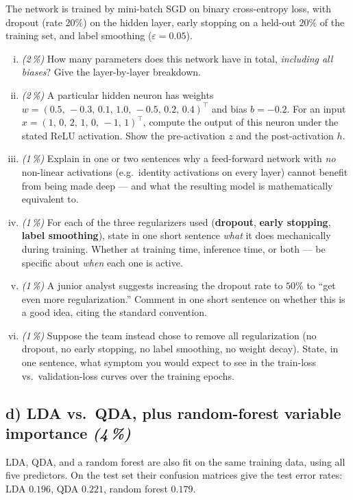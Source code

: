\documentclass[11pt,a4paper]{article}
\newcommand{\subpoints}[1]{\textit{(#1\,\%)}}
\begin{document}
The network is trained by mini-batch SGD on binary cross-entropy loss, with dropout (rate $20\%$) on the hidden layer, early stopping on a held-out $20\%$ of the training set, and label smoothing ($\varepsilon=0.05$).

\begin{enumerate}[(i)]
  \item \subpoints{2} How many parameters does this network have in total, \emph{including all biases}? Give the layer-by-layer breakdown.
  \item \subpoints{2} A particular hidden neuron has weights $w=(0.5,\,-0.3,\,0.1,\,1.0,\,-0.5,\,0.2,\,0.4)^\top$ and bias $b=-0.2$. For an input $x = (1,\,0,\,2,\,1,\,0,\,-1,\,1)^\top$, compute the output of this neuron under the stated ReLU activation. Show the pre-activation $z$ and the post-activation $h$.
  \item \subpoints{1} Explain in one or two sentences why a feed-forward network with \emph{no} non-linear activations (e.g.\ identity activations on every layer) cannot benefit from being made deep --- and what the resulting model is mathematically equivalent to.
  \item \subpoints{1} For each of the three regularizers used (\textbf{dropout}, \textbf{early stopping}, \textbf{label smoothing}), state in one short sentence \emph{what} it does mechanically during training. Whether at training time, inference time, or both --- be specific about \emph{when} each one is active.
  \item \subpoints{1} A junior analyst suggests increasing the dropout rate to $50\%$ to ``get even more regularization.'' Comment in one short sentence on whether this is a good idea, citing the standard convention.
  \item \subpoints{1} Suppose the team instead chose to remove all regularization (no dropout, no early stopping, no label smoothing, no weight decay). State, in one sentence, what symptom you would expect to see in the train-loss vs.\ validation-loss curves over the training epochs.
\end{enumerate}

\subsection*{d) LDA vs.\ QDA, plus random-forest variable importance \subpoints{4}}

LDA, QDA, and a random forest are also fit on the same training data, using all five predictors. On the test set their confusion matrices give the test error rates: LDA $0.196$, QDA $0.221$, random forest $0.179$.
\end{document}
